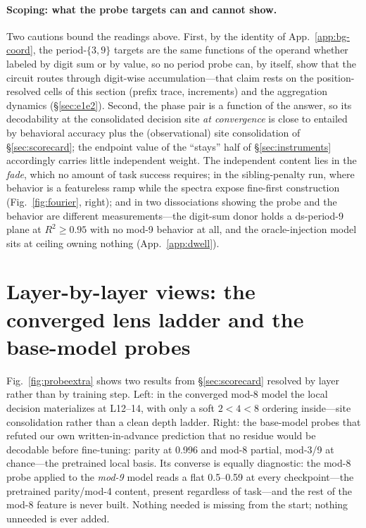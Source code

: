 \documentclass{article} %
\begin{document}
\paragraph{Scoping: what the probe targets can and cannot show.} Two cautions bound the readings above. First, by the identity of App.~\ref{app:bg-coord}, the period-$\{3,9\}$ targets are the same functions of the operand whether labeled by digit sum or by value, so no period probe can, by itself, show that the circuit routes through digit-wise accumulation---that claim rests on the position-resolved cells of this section (prefix trace, increments) and the aggregation dynamics (\S\ref{sec:e1e2}). Second, the phase pair is a function of the answer, so its decodability at the consolidated decision site \emph{at convergence} is close to entailed by behavioral accuracy plus the (observational) site consolidation of \S\ref{sec:scorecard}; the endpoint value of the ``stays'' half of \S\ref{sec:instruments} accordingly carries little independent weight. The independent content lies in the \emph{fade}, which no amount of task success requires; in the sibling-penalty run, where behavior is a featureless ramp while the spectra expose fine-first construction (Fig.~\ref{fig:fourier}, right); and in two dissociations showing the probe and the behavior are different measurements---the digit-sum donor holds a ds-period-9 plane at $R^2 \ge 0.95$ with no mod-9 behavior at all, and the oracle-injection model sits at ceiling owning nothing (App.~\ref{app:dwell}).

\section{Layer-by-layer views: the converged lens ladder and the base-model probes}
\label{app:scorecard}

Fig.~\ref{fig:probeextra} shows two results from \S\ref{sec:scorecard} resolved by layer rather than by training step. Left: in the converged mod-8 model the local decision materializes at L12--14, with only a soft $2{<}4{<}8$ ordering inside---site consolidation rather than a clean depth ladder. Right: the base-model probes that refuted our own written-in-advance prediction that no residue would be decodable before fine-tuning: parity at 0.996 and mod-8 partial, mod-3/9 at chance---the pretrained local basis. Its converse is equally diagnostic: the mod-8 probe applied to the \emph{mod-9} model reads a flat 0.5--0.59 at every checkpoint---the pretrained parity/mod-4 content, present regardless of task---and the rest of the mod-8 feature is never built. Nothing needed is missing from the start; nothing unneeded is ever added.
\end{document}
